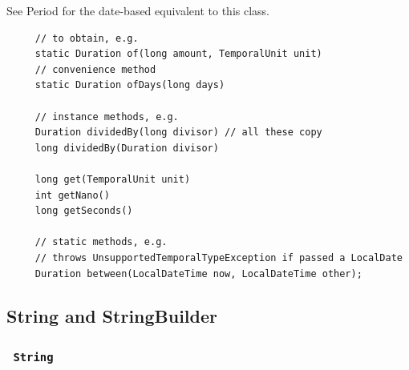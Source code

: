\documentclass{scrartcl}
\begin{document}
    See Period for the date-based equivalent to this class.

     \begin{lstlisting}
     // to obtain, e.g.
     static Duration of(long amount, TemporalUnit unit)
     // convenience method
     static Duration ofDays(long days)

     // instance methods, e.g.
     Duration dividedBy(long divisor) // all these copy
     long dividedBy(Duration divisor)

     long get(TemporalUnit unit)
     int getNano()
     long getSeconds()

     // static methods, e.g.
     // throws UnsupportedTemporalTypeException if passed a LocalDate
     Duration between(LocalDateTime now, LocalDateTime other);
     \end{lstlisting}

 \subsection{String and StringBuilder}
 \subsubsection{\lstinline$ String $}
\end{document}
